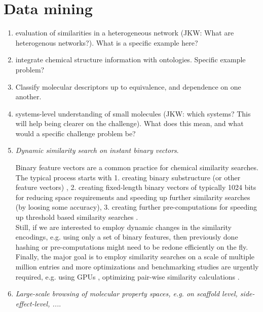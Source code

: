 \documentclass{sig-alternate}
\begin{document}
\section*{Data mining}
\begin{enumerate}
\item evaluation of similarities in a heterogeneous network (JKW: What are heterogenous networks?).  What is a specific example here?
\item integrate chemical structure information with ontologies.  Specific example problem?
\item Classify molecular descriptors up to equivalence, and dependence on one another.
\item systems-level understanding of small molecules (JKW: which systems? This will help being clearer on the challenge).  What does this mean, and what would a specific challenge problem be?
%
%
\item \emph{Dynamic similarity search on instant binary vectors}.

  Binary feature vectors are a common practice for chemical similarity
  searches. The typical process starts with 1. creating binary
  substructure (or other feature vectors) \cite{citeulike:8530538},
  2. creating fixed-length binary vectors of typically 1024 bits for
  reducing space requirements and speeding up further similarity
  searches (by loosing some accuracy), 3. creating further
  pre-computations for speeding up threshold based similarity searches
  \cite{doi:10.1021/ci800076s}.\\  Still, if we are interested to employ
  dynamic changes in the similarity encodings, e.g. using only a set
  of binary features, then previously done hashing or pre-computations
  might need to be redone efficiently on the fly. Finally, the major
  goal is to employ similarity searches \cite{doi:10.1021/ci200235e}
  on a scale of multiple million entries and more optimizations and
  benchmarking studies are urgently required, e.g. using GPUs
  \cite{doi:10.1021/ci1004948}, optimizing pair-wise similarity
  calculations \cite{MINF:MINF201100050}.
%

\item \emph{Large-scale browsing of molecular property spaces, e.g. on scaffold level, side-effect-level, ...}.


\end{enumerate}
\end{document}
